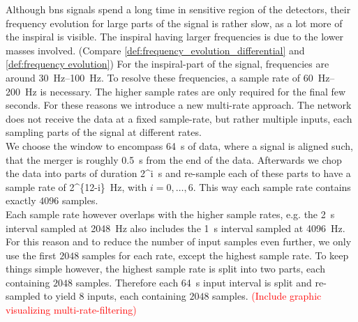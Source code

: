 Although \gls{bns} signals spend a long time in sensitive region of the detectors, their frequency evolution for large parts of the signal is rather slow, as a lot more of the inspiral is visible. The inspiral having larger frequencies is due to the lower masses involved. (Compare \eqref{def:frequency_evolution_differential} and \eqref{def:frequency evolution}) For the inspiral-part of the signal, frequencies are around \SIrange{30}{100}{\hertz}. To resolve these frequencies, a sample rate of \SIrange{60}{200}{\hertz} is necessary. The higher sample rates are only required for the final few seconds. For these reasons we introduce a new multi-rate approach. The network does not receive the data at a fixed sample-rate, but rather multiple inputs, each sampling parts of the signal at different rates.\\
We choose the window to encompass \SI{64}{\s} of data, where a signal is aligned such, that the merger is roughly \SI{0.5}{\s} from the end of the data. Afterwards we chop the data into parts of duration \SI[parse-numbers=false]{2^i}{\s} and re-sample each of these parts to have a sample rate of \SI[parse-numbers=false]{2^{12-i}}{\hertz}, with $i=0,\dotsc ,6$. This way each sample rate contains exactly $4096$ samples.\\
Each sample rate however overlaps with the higher sample rates, e.g. the \SI{2}{\s} interval sampled at \SI{2048}{\hertz} also includes the \SI{1}{\s} interval sampled at \SI{4096}{\hertz}. For this reason and to reduce the number of input samples even further, we only use the first $2048$ samples for each rate, except the highest sample rate. To keep things simple however, the highest sample rate is split into two parts, each containing $2048$ samples. Therefore each \SI{64}{\s} input interval is split and re-sampled to yield 8 inputs, each containing $2048$ samples. \textcolor{red}{(Include graphic visualizing multi-rate-filtering)}
\medskip\\
